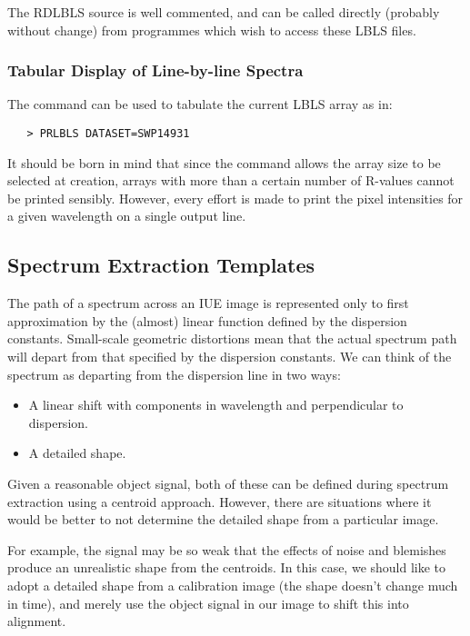 The RDLBLS source is well commented, and can be called directly (probably
without  change) from programmes which wish to access these LBLS files.

\subsubsection{Tabular Display of Line-by-line Spectra}

The 
 command can be used to tabulate the current LBLS array as in:

\begin{verbatim}
   > PRLBLS DATASET=SWP14931
\end{verbatim}

It should be born in mind that since the 
 command allows the array
size to be selected at creation, arrays with more than a certain number of
R-values cannot be printed sensibly.  However, every effort is made to print
the pixel intensities for a given wavelength on a single output line.


\subsection{Spectrum Extraction Templates}

The path of a spectrum across an IUE image is represented only to first
approximation by the (almost) linear function defined by the dispersion
constants.  Small-scale geometric distortions mean that the actual spectrum
path will depart from that specified by the dispersion constants.  We can think
of the spectrum as departing from the dispersion line in two ways:

\begin{itemize}

\item A linear shift with components in wavelength and perpendicular to
      dispersion.

\item A detailed shape.

\end{itemize}

Given a reasonable object signal, both of these can be defined during spectrum
extraction using a centroid approach.  However, there are situations where it
would be better to not determine the detailed shape from a particular image.

For example, the signal may be so weak that the effects of noise and blemishes
produce an unrealistic shape from the centroids.  In this case, we should like
to adopt a detailed shape from a calibration image (the shape doesn't change
much in time), and merely use the object signal in our image to shift this
into alignment.

